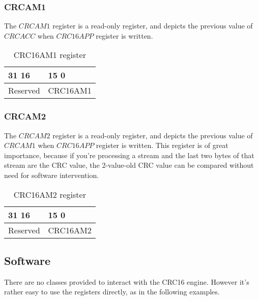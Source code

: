 \subsubsection{CRCAM1}
The $CRCAM1$ register is a read-only register, and depicts the previous value of $CRCACC$ when $CRC16APP$ register is written.

\begin{table}[H]
\begin{center}
\begin{tabularx}{14cm}{XX}
31 \hfill 16 & 15 \hfill 0 \\

\hline
\multicolumn{1}{|c|}{Reserved} & 
\multicolumn{1}{|c|}{CRC16AM1}  \\

\hline
\end{tabularx}
\caption{CRC16AM1 register}
\end{center}
\end{table}

\subsubsection{CRCAM2}
The $CRCAM2$ register is a read-only register, and depicts the previous value of $CRCAM1$ when $CRC16APP$ register is written.
This register is of great importance, because if you're processing a stream and the last two bytes of that stream are the CRC value, 
the 2-value-old CRC value can be compared without need for software intervention.
\begin{table}[H]
\begin{center}
\begin{tabularx}{14cm}{XX}
31 \hfill 16 & 15 \hfill 0 \\

\hline
\multicolumn{1}{|c|}{Reserved} & 
\multicolumn{1}{|c|}{CRC16AM2}  \\

\hline
\end{tabularx}
\caption{CRC16AM2 register}
\end{center}
\end{table}



\subsection{Software}

There are no classes provided to interact with the CRC16 engine. However it's rather easy to use the
registers directly, as in the following examples.

